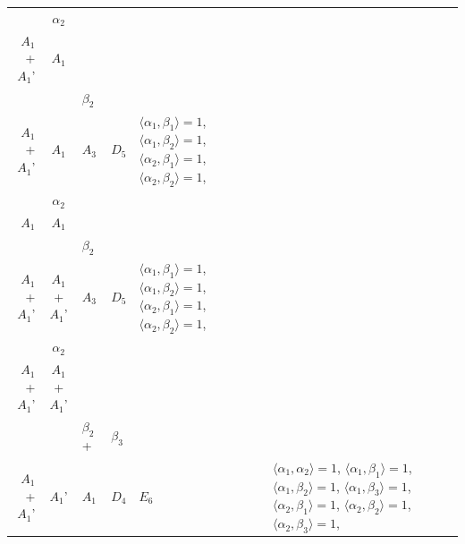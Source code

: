 \documentclass[12pt]{report}
\begin{document}
\begin{appendix}
{\begin{longtable}{rcl p{1cm}p{1cm}p{3cm} }
\\
\begin{tabular}{cc}$\alpha_1$+ & $\alpha_2$\\\tiny{ $A_1$+$A_1$' } & \tiny{ $A_1$ }\end{tabular} &\begin{tabular}{c} = \\~ \end{tabular} & \begin{tabular}{cc}$\beta_1$+ & $\beta_2$\\\tiny{ $A_1$+$A_1$' } & \tiny{ $A_1$ }\end{tabular} & $A_3$ & $D_5$ &  $\langle\alpha_1, \beta_1\rangle=1$, $\langle\alpha_1, \beta_2\rangle=1$, $\langle\alpha_2, \beta_1\rangle=1$, $\langle\alpha_2, \beta_2\rangle=1$, 
\\
\begin{tabular}{cc}$\alpha_1$+ & $\alpha_2$\\\tiny{ $A_1$ } & \tiny{ $A_1$ }\end{tabular} &\begin{tabular}{c} = \\~ \end{tabular} & \begin{tabular}{cc}$\beta_1$+ & $\beta_2$\\\tiny{ $A_1$+$A_1$' } & \tiny{ $A_1$+$A_1$' }\end{tabular} & $A_3$ & $D_5$ &  $\langle\alpha_1, \beta_1\rangle=1$, $\langle\alpha_1, \beta_2\rangle=1$, $\langle\alpha_2, \beta_1\rangle=1$, $\langle\alpha_2, \beta_2\rangle=1$, 
\\
\begin{tabular}{cc}$\alpha_1$+ & $\alpha_2$\\\tiny{ $A_1$+$A_1$' } & \tiny{ $A_1$+$A_1$' }\end{tabular} &\begin{tabular}{c} = \\~ \end{tabular} & \begin{tabular}{ccc}$\beta_1$+ & $\beta_2$+ & $\beta_3$\\\tiny{ $A_1$+$A_1$' } & \tiny{ $A_1$' } & \tiny{ $A_1$ }\end{tabular} & $D_4$ & $E_6$ & $\langle\alpha_1, \alpha_2\rangle=1$,  $\langle\alpha_1, \beta_1\rangle=1$, $\langle\alpha_1, \beta_2\rangle=1$, $\langle\alpha_1, \beta_3\rangle=1$, $\langle\alpha_2, \beta_1\rangle=1$, $\langle\alpha_2, \beta_2\rangle=1$, $\langle\alpha_2, \beta_3\rangle=1$, 
\\

\end{longtable}}
\end{appendix}
\end{document}
